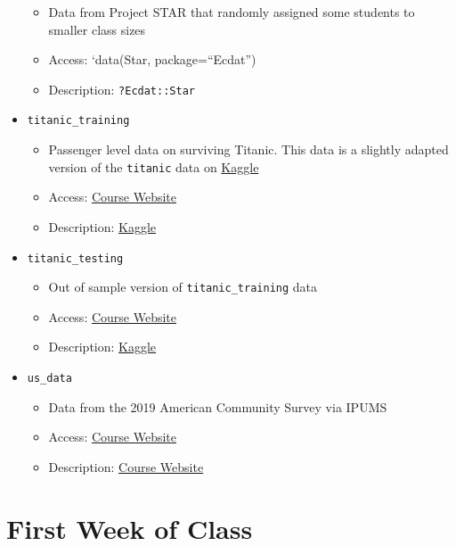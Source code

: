 \documentclass[
  letterpaper,
  DIV=11,
  numbers=noendperiod]{scrreprt}
\begin{document}
\begin{itemize}
  \begin{itemize}
  \item
    Data from Project STAR that randomly assigned some students to
    smaller class sizes
  \item
    Access: `data(Star, package=``Ecdat'')
  \item
    Description: \texttt{?Ecdat::Star}
  \end{itemize}
\item
  \texttt{titanic\_training}

  \begin{itemize}
  \item
    Passenger level data on surviving Titanic. This data is a slightly
    adapted version of the \texttt{titanic} data on
    \href{https://www.kaggle.com/c/titanic}{Kaggle}
  \item
    Access:
    \href{http://bcallaway11.github.io/Courses/ECON_4750_Fall_2023/}{Course
    Website}
  \item
    Description: \href{https://www.kaggle.com/c/titanic/data}{Kaggle}
  \end{itemize}
\item
  \texttt{titanic\_testing}

  \begin{itemize}
  \item
    Out of sample version of \texttt{titanic\_training} data
  \item
    Access:
    \href{http://bcallaway11.github.io/Courses/ECON_4750_Fall_2023/}{Course
    Website}
  \item
    Description: \href{https://www.kaggle.com/c/titanic/data}{Kaggle}
  \end{itemize}
\item
  \texttt{us\_data}

  \begin{itemize}
  \item
    Data from the 2019 American Community Survey via IPUMS
  \item
    Access:
    \href{http://bcallaway11.github.io/Courses/ECON_4750_Fall_2023/}{Course
    Website}
  \item
    Description:
    \href{http://bcallaway11.github.io/Courses/ECON_4750_Fall_2023/}{Course
    Website}
  \end{itemize}
\end{itemize}

\section{First Week of Class}\label{first-week-of-class}
\end{document}
